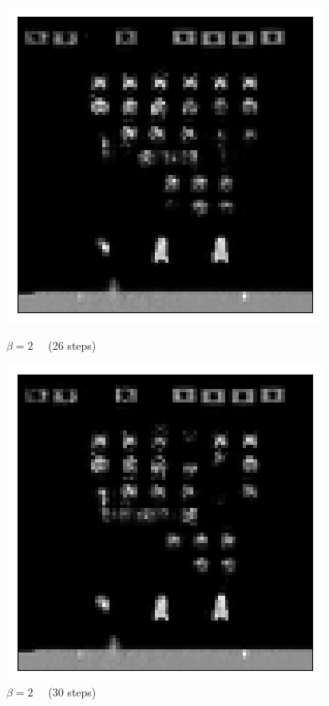 \begin{figure}[h!]
\begin{multicols}{4}
    \includegraphics[scale=0.4]{figures/results/weighted_average/beta_2_posterior_sample_26.png}
    \caption{$\beta=2\quad$ (26 steps)}
    \includegraphics[scale=0.4]{figures/results/weighted_average/beta_2_posterior_sample_30.png}
    \caption{$\beta=2\quad$ (30 steps)}
\end{multicols}


\end{figure}

